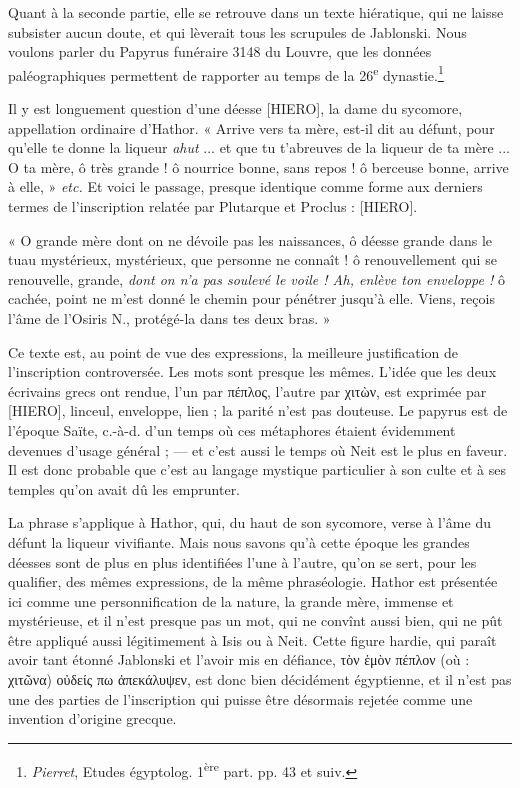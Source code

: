 \documentclass[a4paper, 11pt, oneside]{article}
\begin{document}
Quant à la seconde partie, elle se retrouve dans un texte hiératique, qui ne laisse subsister aucun doute, et qui lèverait tous les scrupules de Jablonski. Nous voulons parler du Papyrus funéraire 3148 du Louvre, que les données paléographiques permettent de rapporter au temps de la 26\textsuperscript{e} dynastie.\footnote{\emph{Pierret}, Etudes égyptolog. 1\textsuperscript{ère} part. pp. 43 et suiv.}

Il y est longuement question d'une déesse [HIERO], la dame du sycomore, appellation ordinaire d'Hathor. « Arrive vers ta mère, est-il dit au défunt, pour qu'elle te donne la liqueur \emph{ahut} ... et que tu t'abreuves de la liqueur de ta mère ... O ta mère, ô très grande ! ô nourrice bonne, sans repos ! ô berceuse bonne, arrive à elle, » \emph{etc.} Et voici le passage, presque identique comme forme aux derniers termes de l'inscription relatée par Plutarque et Proclus : [HIERO].

« O grande mère dont on ne dévoile pas les naissances, ô déesse grande dans le tuau mystérieux, mystérieux, que personne ne connaît ! ô renouvellement qui se renouvelle, grande, \emph{dont on n'a pas soulevé le voile ! Ah, enlève ton enveloppe !} ô cachée, point ne m'est donné le chemin pour pénétrer jusqu'à elle. Viens, reçois l'âme de l'Osiris N., protégé-la dans tes deux bras. »

Ce texte est, au point de vue des expressions, la meilleure justification de l'inscription controversée. Les mots sont presque les mêmes. L'idée que les deux écrivains grecs ont rendue, l'un par πέπλος, l'autre par χιτὼν, est exprimée par [HIERO], linceul, enveloppe, lien ; la parité n'est pas douteuse. Le papyrus est de l'époque Saïte, c.-à-d. d'un temps où ces métaphores étaient évidemment devenues d'usage général ; --- et c'est aussi le temps où Neit est le plus en faveur. Il est donc probable que c'est au langage mystique particulier à son culte et à ses temples qu'on avait dû les emprunter.

La phrase s'applique à Hathor, qui, du haut de son sycomore, verse à l'âme du défunt la liqueur vivifiante. Mais nous savons qu'à cette époque les grandes déesses sont de plus en plus identifiées l'une à l'autre, qu'on se sert, pour les qualifier, des mêmes expressions, de la même phraséologie. Hathor est présentée ici comme une personnification de la nature, la grande mère, immense et mystérieuse, et il n'est presque pas un mot, qui ne convînt aussi bien, qui ne pût être appliqué aussi légitimement à Isis ou à Neit. Cette figure hardie, qui paraît avoir tant étonné Jablonski et l'avoir mis en défiance, τὸν ἑμὸν πέπλον (où : χιτῶνα) οὐδείς πω ἀπεκάλυψεν, est donc bien décidément égyptienne, et il n'est pas une des parties de l'inscription qui puisse être désormais rejetée comme une invention d'origine grecque.
\end{document}
